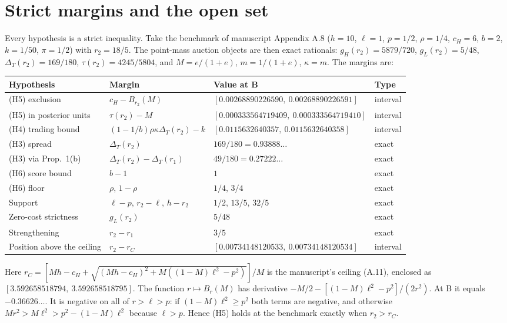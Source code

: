 \documentclass[12pt]{article}
\theoremstyle{remark}
\newcommand{\Dt}{\Delta_T}
\begin{document}
\section{Strict margins and the open set}

Every hypothesis is a strict inequality. Take the benchmark of manuscript Appendix A.8
($h=10$, $\ell=1$, $p=1/2$, $\rho=1/4$, $c_H=6$, $b=2$, $k=1/50$, $\pi=1/2$) with
$r_2=18/5$. The point-mass auction objects are then exact rationals:
$g_H(r_2)=5879/720$, $g_L(r_2)=5/48$, $\Dt(r_2)=169/180$, $\tau(r_2)=4245/5804$, and
$M=e/(1+e)$, $m=1/(1+e)$, $\kappa=m$. The margins are:

\begin{center}
\begin{tabular}{llll}
\toprule
Hypothesis & Margin & Value at B & Type \\
\midrule
(H5) exclusion & $c_H-B_{r_2}(M)$ & $[0.00268890226590,\ 0.00268890226591]$ & interval \\
(H5) in posterior units & $\tau(r_2)-M$ & $[0.000333564719409,\ 0.000333564719410]$ & interval \\
(H4) trading bound & $(1-1/b)\rho\kappa\Dt(r_2)-k$ & $[0.0115632640357,\ 0.0115632640358]$ & interval \\
(H3) spread & $\Dt(r_2)$ & $169/180=0.93888\ldots$ & exact \\
(H3) via Prop.\ 1(b) & $\Dt(r_2)-\Dt(r_1)$ & $49/180=0.27222\ldots$ & exact \\
(H6) score bound & $b-1$ & $1$ & exact \\
(H6) floor & $\rho$, $1-\rho$ & $1/4$, $3/4$ & exact \\
Support & $\ell-p$, $r_2-\ell$, $h-r_2$ & $1/2$, $13/5$, $32/5$ & exact \\
Zero-cost strictness & $g_L(r_2)$ & $5/48$ & exact \\
Strengthening & $r_2-r_1$ & $3/5$ & exact \\
Position above the ceiling & $r_2-r_C$ & $[0.00734148120533,\ 0.00734148120534]$ & interval \\
\bottomrule
\end{tabular}
\end{center}

\noindent
Here $r_C=[Mh-c_H+\sqrt{(Mh-c_H)^2+M((1-M)\ell^2-p^2)}]/M$ is the manuscript's ceiling
(A.11), enclosed as $[3.592658518794,\ 3.592658518795]$. The function $r\mapsto B_r(M)$ has
derivative $-M/2-[(1-M)\ell^2-p^2]/(2r^2)$. At B it equals $-0.36626\ldots$. It is negative on
all of $r>\ell>p$: if $(1-M)\ell^2\ge p^2$ both terms are negative, and otherwise
$Mr^2>M\ell^2>p^2-(1-M)\ell^2$ because $\ell>p$. Hence (H5) holds at the benchmark exactly
when $r_2>r_C$.
\end{document}
